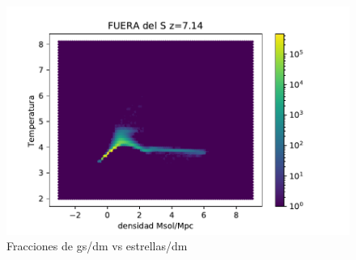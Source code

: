 \begin{figure}[h]
\centering
\includegraphics[width=18cm]{Figures/S_df_s15.pdf}
\decoRule
\caption[Fraccione stellar vs gas]{Fracciones de gs/dm vs estrellas/dm }
\label{fig:Electron}
\end{figure}